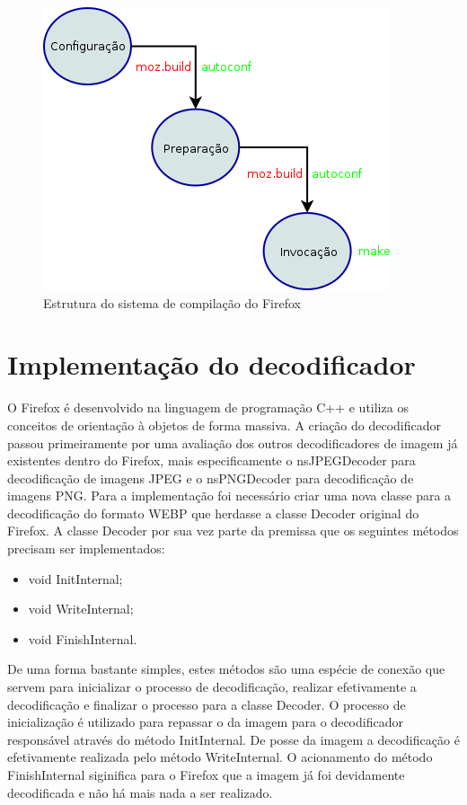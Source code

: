 \documentclass[espaco=simples,appendix=Name]{abnt}
\begin{document}
\begin{figure}[h]
  \centering
    \includegraphics[scale=0.45]{BuildSystem.png}
  \caption{Estrutura do sistema de compilação do Firefox}
\end{figure}

\section{Implementação do decodificador}

O Firefox é desenvolvido na linguagem de programação C++ e utiliza os conceitos de orientação à objetos de forma massiva. A criação do decodificador passou primeiramente por uma avaliação dos outros decodificadores de imagem já existentes dentro do Firefox, mais especificamente o nsJPEGDecoder para decodificação de imagens JPEG e o nsPNGDecoder para decodificação de imagens PNG. Para a implementação foi necessário criar uma nova classe para a decodificação do formato WEBP que herdasse a classe Decoder original do Firefox. A classe Decoder por sua vez parte da premissa que os seguintes métodos precisam ser implementados:

\begin{itemize}
        \item void InitInternal;
        \item void WriteInternal;
        \item void FinishInternal.
\end{itemize}

De uma forma bastante simples, estes métodos são uma espécie de conexão que servem para inicializar o processo de decodificação, realizar efetivamente a decodificação e finalizar o processo para a classe Decoder. O processo de inicialização é utilizado para repassar o  da imagem para o decodificador responsável através do método InitInternal. De posse da imagem a decodificação é efetivamente realizada pelo método WriteInternal. O acionamento do método FinishInternal siginifica para o Firefox que a imagem já foi devidamente decodificada e não há mais nada a ser realizado.
\end{document}
